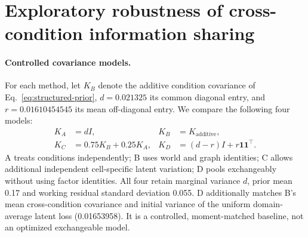\section{Exploratory robustness of cross-condition information sharing}
\label{app:rq2-e1a}
\paragraph{Controlled covariance models.}
For each method, let $K_B$ denote the additive condition covariance of Eq.~\eqref{eq:structured-prior}, $d=0.021325$ its common diagonal entry, and $r=0.01610454545$ its mean off-diagonal entry. We compare the following four models:
\begin{align*}
 K_A&=dI, & K_B&=K_{\mathrm{additive}},\\
 K_C&=0.75K_B+0.25K_A, & K_D&=(d-r)I+r\mathbf{1}\mathbf{1}^{\top}.
\end{align*}
A treats conditions independently; B uses world and graph identities; C allows additional independent cell-specific latent variation; D pools exchangeably without using factor identities. All four retain marginal variance $d$, prior mean 0.17 and working residual standard deviation 0.055. D additionally matches B's mean cross-condition covariance and initial variance of the uniform domain-average latent loss (0.01653958). It is a controlled, moment-matched baseline, not an optimized exchangeable model.

